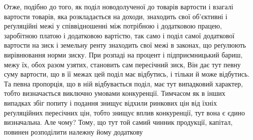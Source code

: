 Отже, подібно до того, як поділ новодолученої до товарів вартости і взагалі
вартости товарів, яка розкладається на доходи, знаходить свої об’єктивні
і реґуляційні межі у співвідношенні між потрібною і додатковою працею, заробітною
платою і додатковою вартістю, так само і поділ самої додаткової вартости
на зиск і земельну ренту знаходить свої межі в законах, що реґулюють
вирівнювання норми зиску. При розпаді на процент і підприємницький
бариш, межу їх, обох разом узятих, становить сам пересічний зиск, Він
дає тут певну суму вартости, що в її межах цей поділ має відбутись, і тільки
й може відбутись. Та певна пропорція, що в ній відбувається поділ, має
тут випадковий характер, тобто визначається виключно умовами конкуренції.
Тимчасом як в інших випадках збіг попиту і подання знищує відхили ринкових
цін від їхніх реґуляційних пересічних цін, тобто знищує вплив конкуренції,
тут вона є єдино визначальна. Але чому? Тому, що тут той
самий чинник продукції, капітал, повинен розподілити належну йому додаткову
\parbreak{}  %
